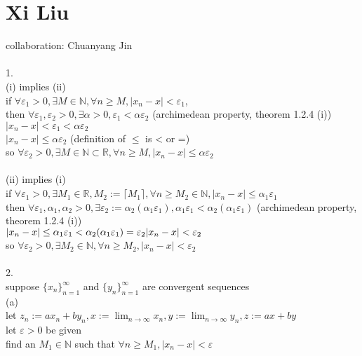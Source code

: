 \documentclass[12pt, border = 4pt, multi]{article} %
\begin{document}
\section*{Xi Liu}
collaboration: Chuanyang Jin\\
\\
1.\\
(i) implies (ii)\\
if $\forall \varepsilon_1 > 0, \exists M \in \mathbb{N}, \forall n \geq M, |x_n - x| < \varepsilon_1$,\\
then $\forall \varepsilon_1, \varepsilon_2 > 0, \exists \alpha > 0, \varepsilon_1 < \alpha \varepsilon_2$ (archimedean property, theorem 1.2.4 (i))\\
$|x_n - x| < \varepsilon_1 < \alpha \varepsilon_2$\\
$|x_n - x| \leq \alpha\varepsilon_2$ (definition of $\leq$ is < or =)\\
so $\forall \varepsilon_2 > 0, \exists M \in \mathbb{N} \subset \mathbb{R}, \forall n \geq M, |x_n - x| \leq \alpha\varepsilon_2$\\
\\
(ii) implies (i)\\
if $\forall \varepsilon_1 > 0, \exists M_1 \in \mathbb{R}, M_2 := \lceil M_1 \rceil, \forall n \geq M_2 \in \mathbb{N}, |x_n - x| \leq \alpha_1\varepsilon_1$\\
then $\forall \varepsilon_1, \alpha_1, \alpha_2 > 0, \exists \varepsilon_2 := \alpha_2(\alpha_1\varepsilon_1), \alpha_1\varepsilon_1 < \alpha_2(\alpha_1 \varepsilon_1)$ (archimedean property, theorem 1.2.4 (i))\\
$|x_n - x| \leq \alpha_1\varepsilon_1 < \alpha_2(\alpha_1\varepsilon_1) = \varepsilon_2\\
|x_n - x| < \varepsilon_2$\\
so $\forall \varepsilon_2 > 0, \exists M_2 \in \mathbb{N}, \forall n \geq M_2, |x_n - x| < \varepsilon_2$\\
\\
2.\\
suppose $\{x_n\}_{n = 1} ^ {\infty}$ and $\{y_n\}_{n = 1} ^ {\infty}$ are convergent sequences\\
(a)\\
let $z_n := ax_n + by_n, x := \lim_{n \rightarrow \infty} x_n, y := \lim_{n \rightarrow \infty} y_n, z := ax + by$\\
let $\varepsilon > 0$ be given\\
find an $M_1 \in \mathbb{N}$ such that $\forall n \geq M_1, |x_n - x| < \varepsilon$\\
\end{document}
